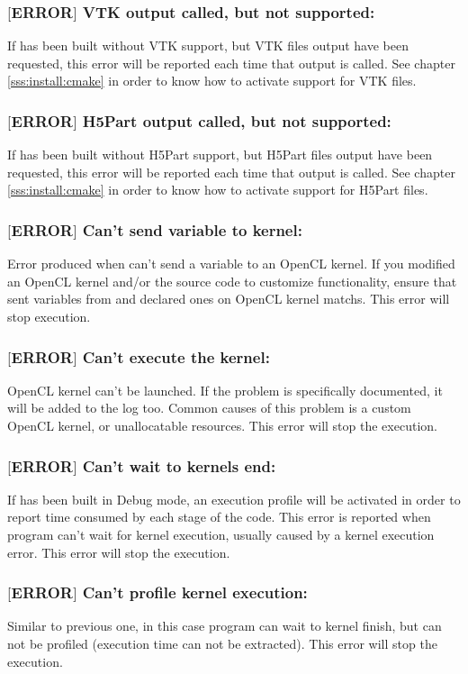 \subsubsection{$[$ERROR$]$ VTK output called, but not supported:}
%
If \NAME has been built without VTK support, but VTK files output have
been requested, this error will be reported each time that output is
called. See chapter \ref{sss:install:cmake} in order to know how to
activate support for VTK files.
%
\subsubsection{$[$ERROR$]$ H5Part output called, but not supported:}
%
If \NAME has been built without H5Part support, but H5Part files output
have been requested, this error will be reported each time that output
is called. See chapter \ref{sss:install:cmake} in order to know how to
activate support for H5Part files.
%
\subsubsection{$[$ERROR$]$ Can't send variable to kernel:}
%
Error produced when \NAME can't send a variable to an OpenCL kernel. If
you modified an OpenCL kernel and/or the source code to customize \NAME
functionality, ensure that sent variables from \NAME and declared ones
on OpenCL kernel matchs.\rc
This error will stop \NAME execution.
%
\subsubsection{$[$ERROR$]$ Can't execute the kernel:}
%
OpenCL kernel can't be launched. If the problem is specifically documented,
it will be added to the log too. Common causes of this problem is a custom
OpenCL kernel, or unallocatable resources.\rc
This error will stop the \NAME execution.
%
\subsubsection{$[$ERROR$]$ Can't wait to kernels end:}
%
If \NAME has been built in Debug mode, an execution profile will be activated in
order to report time consumed by each stage of the code. This error is reported when
program can't wait for kernel execution, usually caused by a kernel execution error.\rc
This error will stop the \NAME execution.
%
\subsubsection{$[$ERROR$]$ Can't profile kernel execution:}
%
Similar to previous one, in this case program can wait to kernel finish, but can not be
profiled (execution time can not be extracted).\rc
This error will stop the \NAME execution.
%
